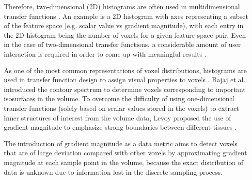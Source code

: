 Therefore, two-dimensional (2D) histograms are often used in multidimensional transfer functions \cite{maciejewski_structuring_2009}. An example is a 2D histogram with axes representing a subset of the feature space (e.g. scalar value vs gradient magnitude), with each entry in the 2D histogram being the number of voxels for a given feature space pair.
Even in the case of two-dimensional transfer functions, a considerable amount of user interaction is required in order to come up with meaningful results \cite{arens_survey_2010}.

As one of the most common representations of voxel distributions, histograms are used in transfer function design to assign visual properties to voxels \cite{pfister_transfer_2001}. Bajaj et al. \cite{bajaj_contour_1997} introduced the contour spectrum to determine voxels corresponding to important isosurfaces in the volume. To overcome the difficulty of using one-dimensional transfer functions (solely based on scalar values stored in the voxels) to extract inner structures of interest from the volume data, Levoy proposed the use of gradient magnitude to emphasize strong boundaries between different tissues \cite{levoy_display_1988}.

The introduction of gradient magnitude as a data metric aims to detect voxels that are of large deviation compared with other voxels by approximating gradient magnitude at each sample point in the volume, because the exact distribution of data is unknown due to information lost in the discrete sampling process.

